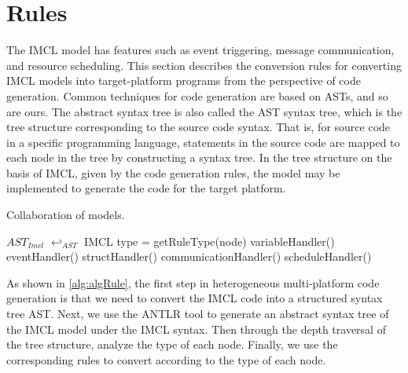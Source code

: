 \section{Rules}
The IMCL model has features such as event triggering, message communication, and resource scheduling. This section describes the conversion rules for converting IMCL models into target-platform programs from the perspective of code generation. Common techniques for code generation are based on ASTs, and so are ours. The abstract syntax tree is also called the AST syntax tree, which is the tree structure corresponding to the source code syntax. That is, for source code in a specific programming language, statements in the source code are mapped to each node in the tree by constructing a syntax tree. In the tree structure on the basis of IMCL, given by the code generation rules, the model may be implemented to generate the code for the target platform.

\begin{algorithm}[htb!]
\small
\label{alg:algRule}
    \caption{Collaboration of models.}
    \BlankLine
    \BlankLine
    \BlankLine

    $AST_{Imcl}$ $\hookleftarrow_{AST}$ IMCL \;
    {
        {
            type = getRuleType(node) \;
            {
                variableHandler()\;
            }
            {
                eventHandler()\;
            }
            {
                structHandler()\;
            }
            {
                communicationHandler()\;
            }
            {
                scheduleHandler()\;
            }
        }
    }
\end{algorithm}


As shown in \ref{alg:algRule}, the first step in heterogeneous multi-platform code generation is that we need to convert the IMCL code into a structured syntax tree AST. Next, we use the ANTLR tool to generate an abstract syntax tree of the IMCL model under the IMCL syntax. Then through the depth traversal of the tree structure, analyze the type of each node. Finally, we use the corresponding rules to convert according to the type of each node. \

